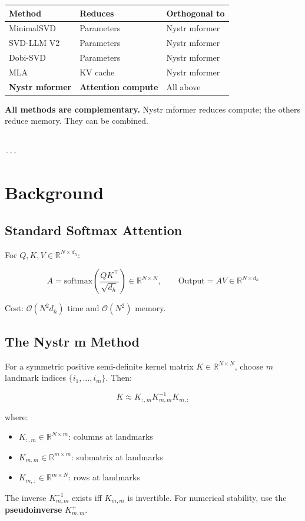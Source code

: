\begin{table}[H]
\centering
\small
\begin{tabular}{lll}
\toprule
\textbf{Method} & \textbf{Reduces} & \textbf{Orthogonal to} \\
\midrule
MinimalSVD & Parameters & Nystr mformer \\
SVD-LLM V2 & Parameters & Nystr mformer \\
Dobi-SVD & Parameters & Nystr mformer \\
MLA & KV cache & Nystr mformer \\
\textbf{Nystr mformer} & \textbf{Attention compute} & All above \\
\bottomrule
\end{tabular}
\end{table}

\textbf{All methods are complementary.} Nystr mformer reduces compute; the others 
reduce memory. They can be combined.
\begin{lstlisting}

---
\end{lstlisting}


\section{Background}

\subsection{Standard Softmax Attention}

For $Q, K, V \in \mathbb{R}^{N \times d_h}$:

\[
A = \mathrm{softmax}\!\left(\frac{Q K^\top}{\sqrt{d_h}}\right) \in \mathbb{R}^{N \times N}, \qquad
\text{Output} = A V \in \mathbb{R}^{N \times d_h}
\tag{3.1}
\]

Cost: $\mathcal{O}(N^2 d_h)$ time and $\mathcal{O}(N^2)$ memory.

\subsection{The Nystr m Method}

For a symmetric positive semi-definite kernel matrix $K \in \mathbb{R}^{N \times N}$, 
choose $m$ landmark indices $\{i_1, \dots, i_m\}$. Then:

\[
K \approx K_{:, m} K_{m, m}^{-1} K_{m, :}
\tag{3.2}
\]

where:

\begin{itemize}
\item $K_{:, m} \in \mathbb{R}^{N \times m}$: columns at landmarks
\item $K_{m, m} \in \mathbb{R}^{m \times m}$: submatrix at landmarks
\item $K_{m, :} \in \mathbb{R}^{m \times N}$: rows at landmarks

\end{itemize}
The inverse $K_{m, m}^{-1}$ exists iff $K_{m, m}$ is invertible. For 
numerical stability, use the \textbf{pseudoinverse} $K_{m, m}^+$.

